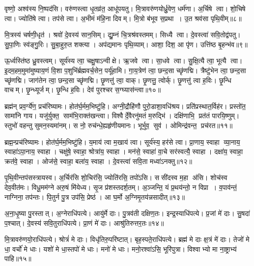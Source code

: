 वृष्णो॒ अश्व॑स्य नि॒ष्पद॑सि। वरु॑णस्त्वा धृ॒तव्र॑त॒ आधू॑पयतु। मि॒त्रावरु॑णयोर्ध्रु॒वेण॒ धर्म॑णा। अ॒र्चिषे त्वा। शो॒चिषे त्वा। ज्योति॑षे त्वा। तप॑से त्वा। अ॒भीमं म॑हि॒ना दिवम्। मि॒त्रो ब॑भूव स॒प्रथा। उ॒त श्रव॑सा पृथि॒वीम्॥८॥

मि॒त्रस्य॑ चर्\mbox{}षणी॒धृत॑। श्रवो॑ दे॒वस्य॑ सान॒सिम्। द्यु॒म्नं चि॒त्रश्र॑वस्तमम्। सिध्यै त्वा। दे॒वस्त्वा॑ सवि॒तोद्व॑पतु। सु॒पा॒णिः स्व॑ङ्गु॒रिः। सु॒बा॒हुरु॒त शक्त्या। अप॑द्यमानः पृथि॒व्याम्। आशा॒ दिश॒ आ पृ॑ण। उत्ति॑ष्ठ बृ॒हन्भ॑व॥९॥

ऊ॒र्ध्वस्ति॑ष्ठ ध्रु॒वस्त्वम्। सूर्य॑स्य त्वा॒ चक्षु॒षाऽन्वीक्षे। ऋ॒जवे त्वा। सा॒धवे त्वा। सु॒क्षि॒त्यै त्वा॒ भूत्यै त्वा। इ॒दम॒हम॒मुमा॑मुष्याय॒णं  वि॒शा प॒शुभि॑र्ब्रह्मवर्च॒सेन॒ पर्यू॑हामि। गा॒य॒त्रेण॑ त्वा॒ छन्द॒सा च्छृ॑णद्मि। त्रैष्टु॑भेन त्वा॒ छन्द॒सा च्छृ॑णद्मि। जाग॑तेन त्वा॒ छन्द॒सा च्छृ॑णद्मि। छृ॒णत्तु॑ त्वा॒ वाक्। छृ॒णत्तु॒ त्वोर्क्। छृ॒णत्तु॑ त्वा ह॒विः। छृ॒न्धि वाचम्। छृ॒न्ध्यूर्जम्। छृ॒न्धि ह॒विः। देव॑ पुरश्चर स॒ग्घ्यास॑न्त्वा॥१०॥
\anuvakamend[पृ॒थि॒वीं भ॑व॒ वाख्षट्च॑]

ब्रह्म॑न् प्रव॒र्ग्ये॑ण॒ प्रच॑रिष्यामः। होत॑र्घ॒र्मम॒भिष्टु॑हि। अग्नी॒द्रौहि॑णौ पुरो॒डाशा॒वधि॑श्रय। प्रति॑प्रस्थात॒र्विह॑र। प्रस्तो॑त॒ सामा॑नि गाय। यजु॑र्\mbox{}युक्त॒ साम॑भि॒राक्त॑खन्त्वा। विश्वैर्दे॒वैरनु॑मतं म॒रुद्भि॑। दक्षि॑णाभि॒ प्रत॑तं पारयि॒ष्णुम्। स्तुभो॑ वहन्तु सुमन॒स्यमा॑नम्। स नो॒ रुच॑न्धे॒ह्यहृ॑णीयमानः। भूर्भुव॒ सुव॑। ओमिन्द्र॑वन्त॒ प्रच॑रत॥११॥
\anuvakamend[अहृ॑णीयमानो॒ द्वे च॑]

ब्रह्म॒न्प्रच॑रिष्यामः। होत॑र्घ॒र्मम॒भिष्टु॑हि। य॒माय॑ त्वा म॒खाय॑ त्वा। सूर्य॑स्य॒ हर॑से त्वा। प्रा॒णाय॒ स्वाहा व्या॒नाय॒ स्वाहा॑ऽपा॒नाय॒ स्वाहा। चक्षु॑षे॒ स्वाहा॒ श्रोत्रा॑य॒ स्वाहा। मन॑से॒ स्वाहा॑ वा॒चे सर॑स्वत्यै॒ स्वाहा। दक्षा॑य॒ स्वाहा॒ क्रत॑वे॒ स्वाहा। ओज॑से॒ स्वाहा॒ बला॑य॒ स्वाहा। दे॒वस्त्वा॑ सवि॒ता मध्वा॑ऽनक्तु॥१२॥

पृ॒थि॒वीन्तप॑सस्त्रायस्व। अ॒र्चिर॑सि शो॒चिर॑सि॒ ज्योति॑रसि॒ तपो॑ऽसि। ससी॑दस्व म॒हा अ॑सि। शोच॑स्व देव॒वीत॑मः। विधू॒मम॑ग्ने अरु॒षं मि॑येध्य। सृ॒ज प्र॑शस्तदर्\mbox{}श॒तम्। अ॒ञ्जन्ति॒ यं प्र॒थय॑न्तो॒ न विप्रा। व॒पाव॑न्तं॒ नाग्निना॒ तप॑न्तः। पि॒तुर्न पु॒त्र उप॑सि॒ प्रेष्ठ॑। आ घ॒र्मो अ॒ग्निमृ॒तय॑न्नसादीत्॥१३॥

अ॒ना॒धृ॒ष्या पु॒रस्तात्। अ॒ग्नेराधि॑पत्ये। आयु॑र्मे दाः। पु॒त्रव॑ती दक्षिण॒तः। इन्द्र॒स्याधि॑पत्ये। प्र॒जां मे॑ दाः। सु॒षदा॑ प॒श्चात्। दे॒वस्य॑ सवि॒तुराधि॑पत्ये। प्रा॒णं मे॑ दाः। आश्रु॑तिरुत्तर॒तः॥१४॥

मि॒त्रावरु॑णयो॒राधि॑पत्ये। श्रोत्रं॑ मे दाः। विधृ॑तिरु॒परि॑ष्टात्। बृह॒स्पते॒राधि॑पत्ये। ब्रह्म॑ मे दाः क्ष॒त्रं मे॑ दाः। तेजो॑ मे धा॒ वर्चो॑ मे धाः। यशो॑ मे धा॒स्तपो॑ मे धाः। मनो॑ मे धाः। मनो॒रश्वा॑ऽसि॒ भूरि॑पुत्रा। विश्वाभ्यो मा ना॒ष्ट्राभ्य॑ पाहि॥१५॥

